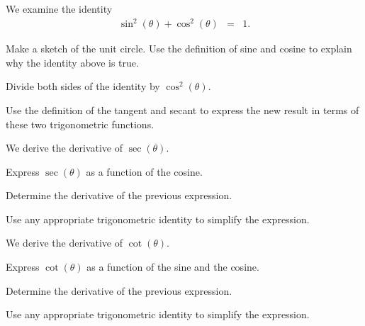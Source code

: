 \begin{problem}

\item We examine the identity
  \begin{eqnarray*}
    \sin^2(\theta) + \cos^2(\theta) & = & 1.
  \end{eqnarray*}

  \begin{subproblem}
  \item Make a sketch of the unit circle. Use the definition of sine
    and cosine to explain why the identity above is true.
    \vfill

  \item Divide both sides of the identity by $\cos^2(\theta)$.
    \vfill

  \item Use the definition of the tangent and secant to express the
    new result in terms of these two trigonometric functions.
    \vfill

  \end{subproblem}

  \clearpage

\item We derive the derivative of $\sec(\theta)$.

  \begin{subproblem}
    \item Express $\sec(\theta)$ as a function of the cosine.
      \vspace{4em}
    \item Determine the derivative of the previous expression.
      \vfill
    \item Use any appropriate trigonometric identity to simplify the
      expression.
      \vfill
  \end{subproblem}
  \clearpage

\item We derive the derivative of $\cot(\theta)$.

  \begin{subproblem}
  \item Express $\cot(\theta)$ as a function of the sine and the
    cosine.
    \vspace{4em}
    \item Determine the derivative of the previous expression.
      \vfill
    \item Use any appropriate trigonometric identity to simplify the
      expression.
      \vfill
  \end{subproblem}
  \clearpage

\end{problem}

